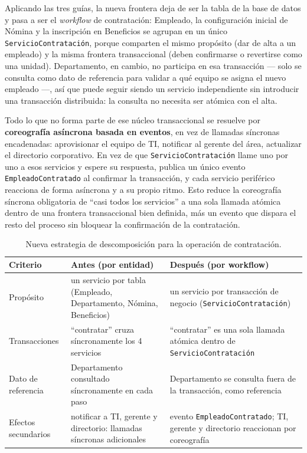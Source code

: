 Aplicando las tres guías, la nueva frontera deja de ser la tabla de la base de
datos y pasa a ser el \emph{workflow} de contratación: Empleado, la configuración
inicial de Nómina y la inscripción en Beneficios se agrupan en un único
\texttt{ServicioContratación}, porque comparten el mismo propósito (dar de alta a
un empleado) y la misma frontera transaccional (deben confirmarse o revertirse
como una unidad). Departamento, en cambio, no participa en esa transacción ---
solo se consulta como dato de referencia para validar a qué equipo se asigna el
nuevo empleado ---, así que puede seguir siendo un servicio independiente sin
introducir una transacción distribuida: la consulta no necesita ser atómica con
el alta.

Todo lo que no forma parte de ese núcleo transaccional se resuelve por
\textbf{coreografía asíncrona basada en eventos}, en vez de llamadas síncronas
encadenadas: aprovisionar el equipo de TI, notificar al gerente del área, actualizar el directorio corporativo. En vez de
que \texttt{ServicioContratación} llame uno por uno a esos servicios y espere su
respuesta, publica un único evento \texttt{EmpleadoContratado} al confirmar la
transacción, y cada servicio periférico reacciona de forma asíncrona y a su propio
ritmo. Esto reduce la coreografía síncrona obligatoria de ``casi todos los
servicios'' a una sola llamada atómica dentro de una frontera transaccional bien
definida, más un evento que dispara el resto del proceso sin bloquear la
confirmación de la contratación.

\begin{table}[H]
  \centering
  \caption{Nueva estrategia de descomposición para la operación de contratación.}
  \label{tab:p4b-comparacion}
  \small
  \renewcommand{\arraystretch}{1.35}
  \begin{tabularx}{\textwidth}{>{\raggedright\arraybackslash}p{2.7cm} >{\raggedright\arraybackslash}X >{\raggedright\arraybackslash}X}
    \toprule
    \textbf{Criterio} & \textbf{Antes (por entidad)} & \textbf{Después (por workflow)} \\
    \midrule
    Propósito &
      un servicio por tabla (Empleado, Departamento, Nómina, Beneficios) &
      un servicio por transacción de negocio (\texttt{ServicioContratación}) \\
    Transacciones &
      ``contratar'' cruza síncronamente los 4 servicios &
      ``contratar'' es una sola llamada atómica dentro de \texttt{ServicioContratación} \\
    Dato de referencia &
      Departamento consultado síncronamente en cada paso &
      Departamento se consulta fuera de la transacción, como referencia \\
    Efectos secundarios &
      notificar a TI, gerente y directorio: llamadas síncronas adicionales &
      evento \texttt{EmpleadoContratado}; TI, gerente y directorio reaccionan por
      coreografía \\
    \bottomrule
  \end{tabularx}
\end{table}

